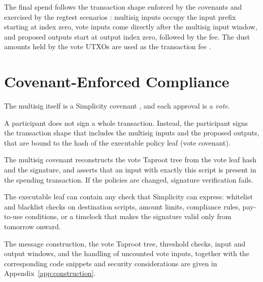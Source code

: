 \documentclass[11pt]{article}
\begin{document}
    The final spend follows the transaction shape enforced by the covenants and exercised by the regtest scenarios \cite{native-multisig-regtest}: multisig inputs occupy the input prefix starting at index zero, vote inputs come directly after the multisig input window, and proposed outputs start at output index zero, followed by the fee. The dust amounts held by the vote UTXOs are used as the transaction fee \cite{native-multisig-spend}.


    \section{Covenant-Enforced Compliance}
    \label{sec:compliance}

    The multisig itself is a Simplicity covenant \cite{native-multisig-multisig}, and each approval is a \emph{vote}.

    A participant does not sign a whole transaction. Instead, the participant signs the transaction shape that includes the multisig inputs and the proposed outputs, that are bound to the hash of the executable policy leaf (vote covenant).

    The multisig covenant reconstructs the vote Taproot tree from the vote leaf hash and the signature, and asserts that an input with exactly this script is present in the spending transaction. If the policies are changed, signature verification fails.

    The executable leaf can contain any check that Simplicity can express: whitelist and blacklist checks on destination scripts, amount limits, compliance rules, pay-to-use conditions, or a timelock that makes the signature valid only from tomorrow onward.

    The message construction, the vote Taproot tree, threshold checks, input and output windows, and the handling of uncounted vote inputs, together with the corresponding code snippets and security considerations are given in Appendix~\ref{app:construction}.
\end{document}

